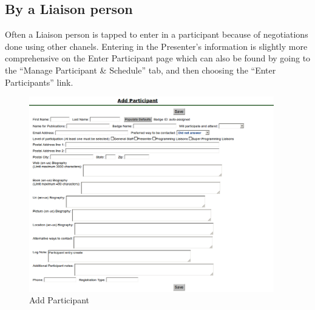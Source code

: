 \documentclass[tablesignature]{scrartcl}
\begin{document}
\subsection{By a Liaison person}
\label{sec-2_2}

\label{StaffEditCreateParticipant.php}
   
   Often a Liaison person is tapped to enter in a participant because
   of negotiations done using other chanels.  Entering in the
   Presenter's information is slightly more comprehensive on the Enter
   Participant page which can also be found by going to the ``Manage
   Participant \& Schedule'' tab, and then choosing the ``Enter
   Participants'' link.


\begin{figure}[H]
\centering
\includegraphics[width=0.95\textwidth]{./Images/Add_Participant.png}
\caption{\label{fig:Zambia_Presenter_Flow_Add_Participant}Add Participant}
\end{figure}
\end{document}
